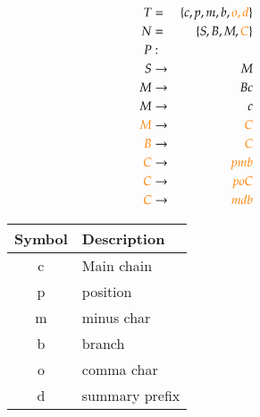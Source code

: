 \documentclass[a4paper,10pt]{article}
\newcommand{\captionVSpace}{\vspace*{-0.05cm}}
\newcommand{\CFGDefinitionSize}{0.60}
\newcommand{\SymbolDescriptionTable}{0.35}
\newcommand{\colorNew}{orange}
\begin{document}
\begin{figure}[H]
    \begin{minipage}[l]{\CFGDefinitionSize\textwidth}
        $$
        \begin{aligned}
            T &=& \{c, p, m, b, {\color{\colorNew}o, d}\} \\
            N &=& \{S, B, M, {\color{\colorNew}C}\} \\
            P &:& \\
            S &\rightarrow& M \\
            M &\rightarrow& Bc \\
            M &\rightarrow& c \\
            {\color{\colorNew}M} &\rightarrow& {\color{\colorNew}C} \\
            {\color{\colorNew}B} &\rightarrow& {\color{\colorNew}C} \\
            {\color{\colorNew}C} &\rightarrow& {\color{\colorNew}pmb} \\
            {\color{\colorNew}C} &\rightarrow& {\color{\colorNew}poC} \\
            {\color{\colorNew}C} &\rightarrow& {\color{\colorNew}mdb} \\
        \end{aligned}
        $$
        \caption{CFG with multiple branches and same length. Several usage of $C \rightarrow poC$ creates successive positions.}
        \label{fig:CFGWithMultipleBranchesAtTheSameLength}
    \end{minipage}
    \begin{minipage}[r]{\SymbolDescriptionTable\textwidth}
        \begin{table}[H]
        \centering
            \begin{tabular}{c|l}
                \toprule
                \textbf{Symbol} & \textbf{Description} \\
                \midrule
                c & Main chain \\
                p & position \\
                m & minus char \\
                b & branch \\
                o & comma char \\
                d & summary prefix \\
                \bottomrule
            \end{tabular}
        \end{table}
    \end{minipage}
\end{figure}
\end{document}
